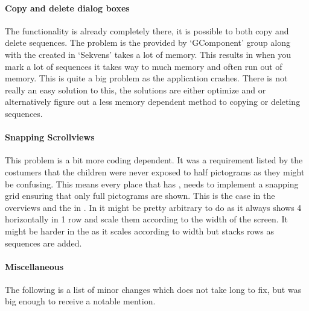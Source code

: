 \paragraph{Copy and delete dialog boxes} The functionality is already completely there, it is possible to both copy and delete sequences. The problem is the  provided by `GComponent' group along with the  created in `Sekvens' takes a lot of memory. This results in when you mark a lot of sequences it takes way to much memory and often run out of memory. This is quite a big problem as the application crashes. There is not really an easy solution to this, the solutions are either optimize  and  or alternatively figure out a less memory dependent method to copying or deleting sequences. 

\paragraph{Snapping Scrollviews} This problem is a bit more coding dependent. It was a requirement listed by the costumers  that the children were never exposed to half pictograms as they might be confusing. This means every place that has , needs to implement a snapping grid ensuring that only full pictograms are shown. This is the case in the overviews  and the  in . In  it might be pretty arbitrary to do as it always shows 4  horizontally in 1 row and scale them according to the width of the screen. It might be harder in the  as it scales according to width but stacks rows as sequences are added. 

\paragraph{Miscellaneous}
The following is a list of minor changes which does not take long to fix, but was big enough to receive a notable mention. 

